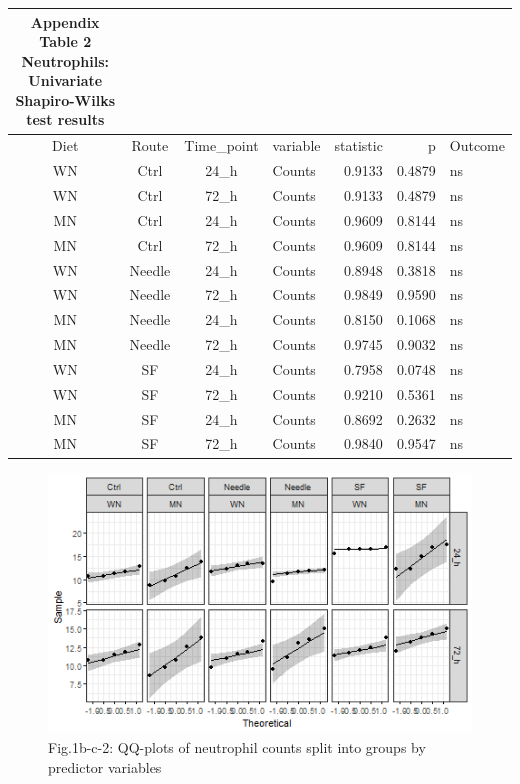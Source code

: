 \documentclass[
  12pt,
  letterpaper,
]{article}
\begin{document}
\begingroup
\fontsize{12.0pt}{14.4pt}\selectfont
\begin{longtable}{ccclrrl}
\caption*{
{\large \textbf{Appendix Table 2}} \\ 
{\small \textbf{Neutrophils: Univariate Shapiro-Wilks test results}}
} \\ 
\toprule
{Diet} & {Route} & Time\_point & {variable} & {statistic} & {p} & {Outcome} \\ 
\midrule\addlinespace[2.5pt]
WN & Ctrl & 24\_h & Counts & 0.9133 & 0.4879 & ns \\ 
WN & Ctrl & 72\_h & Counts & 0.9133 & 0.4879 & ns \\ 
MN & Ctrl & 24\_h & Counts & 0.9609 & 0.8144 & ns \\ 
MN & Ctrl & 72\_h & Counts & 0.9609 & 0.8144 & ns \\ 
WN & Needle & 24\_h & Counts & 0.8948 & 0.3818 & ns \\ 
WN & Needle & 72\_h & Counts & 0.9849 & 0.9590 & ns \\ 
MN & Needle & 24\_h & Counts & 0.8150 & 0.1068 & ns \\ 
MN & Needle & 72\_h & Counts & 0.9745 & 0.9032 & ns \\ 
WN & SF & 24\_h & Counts & 0.7958 & 0.0748 & ns \\ 
WN & SF & 72\_h & Counts & 0.9210 & 0.5361 & ns \\ 
MN & SF & 24\_h & Counts & 0.8692 & 0.2632 & ns \\ 
MN & SF & 72\_h & Counts & 0.9840 & 0.9547 & ns \\ 
\bottomrule
\end{longtable}
\endgroup

\begin{figure}[H]

{\centering \includegraphics[width=0.95\linewidth,]{Statistics_Report_files/figure-latex/qq-plot-figure-1b-c-neutrophils-1} 

}

\caption{Fig.1b-c-2: QQ-plots of neutrophil counts split into groups by predictor variables}\label{fig:qq-plot-figure-1b-c-neutrophils}
\end{figure}
\end{document}

